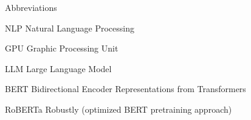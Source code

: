 
\begin{dictionary}{Abbreviations}
\item[NLP]	Natural Language Processing
\item[GPU]	Graphic Processing Unit
\item[LLM]	Large Language Model
\item[BERT]	Bidirectional Encoder Representations from Transformers
\item[RoBERTa]	Robustly (optimized BERT pretraining approach)
\end{dictionary}
